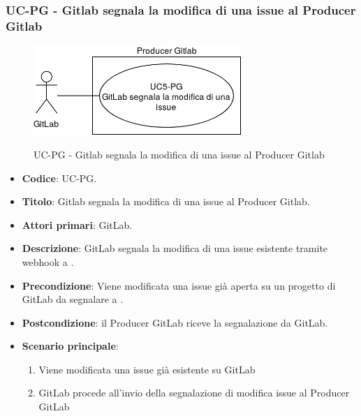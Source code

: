 	\subsubsection{UC\theuccount-PG - Gitlab segnala la modifica di una issue al Producer Gitlab}
	\begin{figure}[H]
		\centering
		\includegraphics[width=0.7\textwidth]{img/casi_d'uso/UC5.png}\\
		\caption{UC\theuccount-PG - Gitlab segnala la modifica di una issue al Producer Gitlab}
	\end{figure}
	\begin{itemize}
		\item \textbf{Codice}: UC\theuccount-PG.
		\item \textbf{Titolo}: Gitlab segnala la modifica di una issue al Producer Gitlab.
		\item \textbf{Attori primari}: GitLab.
		\item \textbf{Descrizione}: GitLab segnala la modifica di una issue esistente tramite webhook a
		\newline \progetto.
		\item \textbf{Precondizione}: Viene modificata una issue già aperta su un
		progetto di GitLab da segnalare a \progetto.
		\item \textbf{Postcondizione}: il Producer GitLab riceve la segnalazione da GitLab.
		\item \textbf{Scenario principale}: 
		\begin{enumerate}
			\item Viene modificata una issue già esistente su GitLab
			\item GitLab procede all'invio della segnalazione di modifica issue al Producer GitLab
		\end{enumerate}
		
	\end{itemize}